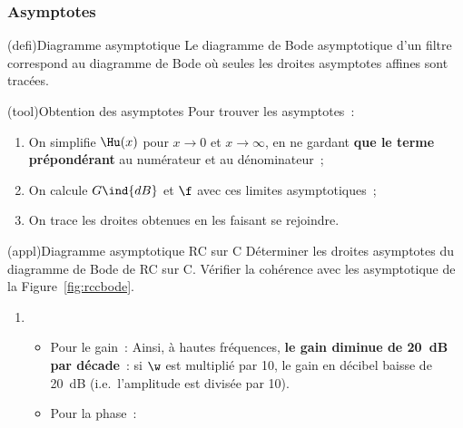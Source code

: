 \documentclass[../../main/main.tex]{subfiles}
\begin{document}
\subsubsection{Asymptotes}
\begin{tcb*}(defi){Diagramme asymptotique}
	Le diagramme de Bode asymptotique d’un filtre correspond au diagramme de Bode
	où seules les droites asymptotes affines sont tracées.
\end{tcb*}
\begin{tcb*}(tool){Obtention des asymptotes}
	Pour trouver les asymptotes~:
	\begin{enumerate}
		\item On simplifie $\Hu(x)$ pour $x\to 0$ et $x\to \infty$, en ne gardant
		      \textbf{que le terme prépondérant} au numérateur et au dénominateur~;
		\item On calcule $G\ind{dB}$ et $\f$ avec ces limites asymptotiques~;
		\item On trace les droites obtenues en les faisant se rejoindre.
	\end{enumerate}
\end{tcb*}
\begin{tcb*}(appl){Diagramme asymptotique RC sur C}
	Déterminer les droites asymptotes du diagramme de Bode de RC sur C. Vérifier
	la cohérence avec les asymptotique de la Figure~\ref{fig:rccbode}.
	\tcblower
	\vspace{12pt}
	\begin{enumerate}
		\mitem
		\psw{
			\[
				\boxed{
					\Hu(x) \opto{}{x\to 0} \frac{1}{1 + 0} = 1
					\qet
					\Hu(x) \opto{}{x\to \infty} \frac{1}{\jx}
				}
			\]
		}
		\vspace{-15pt}
		\item
		      \begin{itemize}
			      \item Pour le gain~:
			            \psw{
				            \[
					            G\ind{dB}(x) \opto{}{x\to 0} 20 \log (1) = 0
					            \qet
					            G\ind{dB}(x) \opto{}{x\to\infty} 20 \log \abs{\frac{1}{\jx}} = -20 \log
					            x
				            \]
			            }%
			            Ainsi, à hautes fréquences, \textbf{le gain diminue de
				            \SI{20}{dB} par décade}~: si $\w$ est multiplié par 10, le
			            gain en décibel baisse de \SI{20}{dB} (i.e.\ l'amplitude est
			            divisée par 10).
			      \item Pour la phase~:
			            \psw{
				            \[
					            \f(x) \opto{}{x\to 0} \arg*{1} = 0
					            \qet
					            \f(x) \opto{}{x\to \infty} \arg*{\frac{1}{\jx}} = -\frac{\pi}{2}
				            \]
			            }
			            \vspace{-15pt}
		      \end{itemize}
	\end{enumerate}
\end{tcb*}
\end{document}
